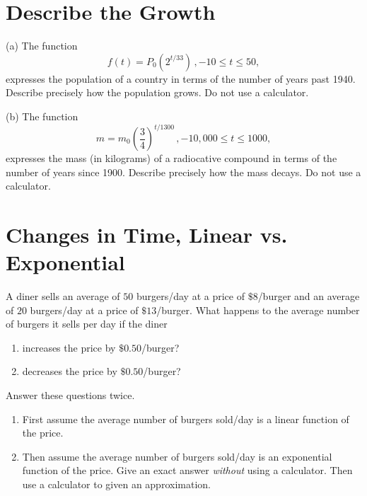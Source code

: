 \documentclass{ximera}
\begin{document}
\section{Describe the Growth}

\begin{question} \label{Q23:ExponentialG54}
(a) The function 
\[
   f(t) = P_0 (2^{t/33}) \, , -10\leq t \leq 50 ,
\]
expresses the population of a country in terms of the number of years past 1940. Describe precisely how the population grows. Do not use a calculator.

(b) The function 
\[
   m = m_0 \left( \frac{3}{4} \right)^{t/1300} \, , -10,000\leq t \leq 1000 ,
\]
expresses the mass (in kilograms) of a radiocative compound in terms of the number of years since 1900. Describe precisely how the mass decays. Do not use a calculator.

\end{question}


\section{Changes in Time, Linear vs. Exponential}

\begin{question} \label{QLDFerF}
A diner sells an average of $50$ burgers/day at a price of $\$8$/burger and an average of $20$ burgers/day at a price of $\$13$/burger. What happens to the average number of burgers it sells per day if the diner 
\begin{enumerate}
\item increases the price by $\$0.50$/burger?

\item decreases the price by $\$0.50$/burger?
\end{enumerate}

Answer these questions twice. 
\begin{enumerate}
\item First assume the average number of burgers sold/day is a linear function of the price.

\item Then assume the average number of burgers sold/day is an exponential function of the price. Give an exact answer \emph{without} using a calculator. Then use a calculator to given an approximation.
\end{enumerate}
\end{question}
\end{document}
